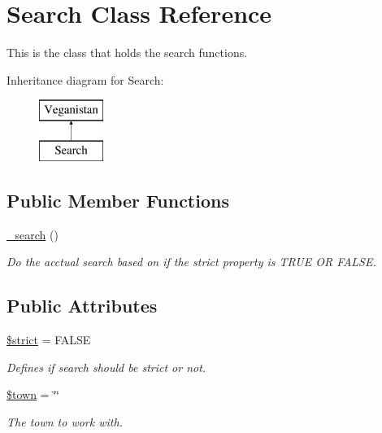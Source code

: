 \hypertarget{class_search}{}\section{Search Class Reference}
\label{class_search}


This is the class that holds the search functions.  


Inheritance diagram for Search\+:\begin{figure}[H]
\begin{center}
\leavevmode
\includegraphics[height=2.000000cm]{class_search}
\end{center}
\end{figure}
\subsection*{Public Member Functions}
\begin{DoxyCompactItemize}
\item 
\hyperlink{class_search_a80725b6a32dfc685558764d47002d9c0}{\+\_\+search} ()
\begin{DoxyCompactList}\small\item\em Do the acctual search based on if the strict property is T\+R\+U\+E O\+R F\+A\+L\+S\+E. \end{DoxyCompactList}\end{DoxyCompactItemize}
\subsection*{Public Attributes}
\begin{DoxyCompactItemize}
\item 
\hyperlink{class_search_ad5a555c9913e06e21914adb4d9fc36d6}{\$strict} = F\+A\+L\+S\+E
\begin{DoxyCompactList}\small\item\em Defines if search should be strict or not. \end{DoxyCompactList}\item 
\hyperlink{class_search_aab54895afb81d800b1aa7b5ed1e316d2}{\$town} = \char`\"{}\char`\"{}
\begin{DoxyCompactList}\small\item\em The town to work with. \end{DoxyCompactList}\end{DoxyCompactItemize}

